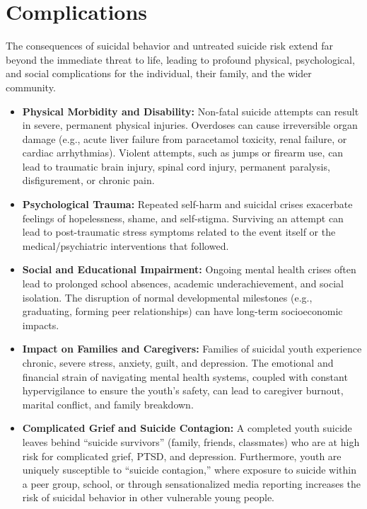\section*{Complications}
The consequences of suicidal behavior and untreated suicide risk extend far beyond the immediate threat to life, leading to profound physical, psychological, and social complications for the individual, their family, and the wider community.
\begin{itemize}
    \item \textbf{Physical Morbidity and Disability:} Non-fatal suicide attempts can result in severe, permanent physical injuries. Overdoses can cause irreversible organ damage (e.g., acute liver failure from paracetamol toxicity, renal failure, or cardiac arrhythmias). Violent attempts, such as jumps or firearm use, can lead to traumatic brain injury, spinal cord injury, permanent paralysis, disfigurement, or chronic pain.
    \item \textbf{Psychological Trauma:} Repeated self-harm and suicidal crises exacerbate feelings of hopelessness, shame, and self-stigma. Surviving an attempt can lead to post-traumatic stress symptoms related to the event itself or the medical/psychiatric interventions that followed.
    \item \textbf{Social and Educational Impairment:} Ongoing mental health crises often lead to prolonged school absences, academic underachievement, and social isolation. The disruption of normal developmental milestones (e.g., graduating, forming peer relationships) can have long-term socioeconomic impacts.
    \item \textbf{Impact on Families and Caregivers:} Families of suicidal youth experience chronic, severe stress, anxiety, guilt, and depression. The emotional and financial strain of navigating mental health systems, coupled with constant hypervigilance to ensure the youth's safety, can lead to caregiver burnout, marital conflict, and family breakdown.
    \item \textbf{Complicated Grief and Suicide Contagion:} A completed youth suicide leaves behind ``suicide survivors'' (family, friends, classmates) who are at high risk for complicated grief, PTSD, and depression. Furthermore, youth are uniquely susceptible to ``suicide contagion,'' where exposure to suicide within a peer group, school, or through sensationalized media reporting increases the risk of suicidal behavior in other vulnerable young people.
\end{itemize}

